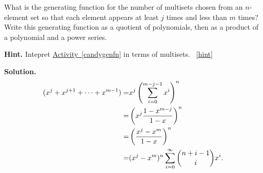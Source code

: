 \documentclass{book}
\begin{document}
\setcounter{project}{257}
\addtocounter{project}{-1}
\begin{activity}[]\label{activity-250}
\hypertarget{p-1357}{}%
What is the generating function for the number of multisets chosen from an \(n\)-element set so that each element appears at least \(j\) times and less than \(m\) times? Write this generating function as a quotient of polynomials, then as a product of a polynomial and a power series.%
\par\smallskip%
\noindent\textbf{Hint.}\hypertarget{hint-166}{}\quad%
\hypertarget{p-1358}{}%
Intepret \hyperref[candygenfn]{Activity~\ref{candygenfn}} in terms of multisets.%
~\hfill{\tiny\hyperlink{a-257}{[hint]}\hypertarget{q-257}{}}\par\smallskip%
\noindent\textbf{Solution.}\hypertarget{solution-167}{}\quad%
\hypertarget{p-1359}{}%
%
\begin{align*}
(x^j+x^{j+1}+\cdots+x^{m-1}) =& x^j
\left(\sum_{i=0}^{m-j-1}x^i\right)^n\\
=&
\left(x^j\frac{1-x^{m-j}}{1-x}\right)^n\\
=& \left(\frac{x^j-x^m}{1-x}\right)^n\\
=&  (x^j-x^m)^n\sum_{i=0}^\infty \binom{n+i-1}{i}x^i.
\end{align*}
%
\end{activity}
\end{document}
